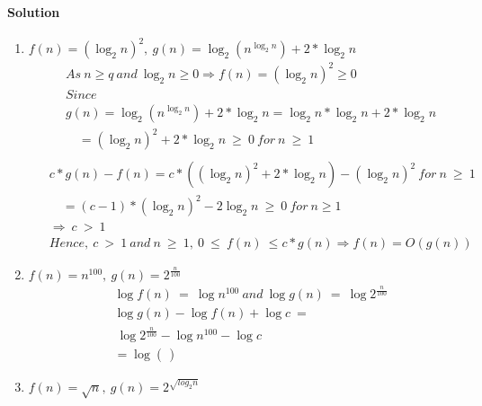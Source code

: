\documentclass[a4paper]{scrartcl}
\begin{document}
\paragraph{Solution}
\begin{enumerate}[label=(\alph*)]
  \item $f(n)=\left(\log_2n\right)^2,\ g(n)=\log_2\left(n^{\log_2{n}}\right) + 2*\log_2{n}$
  \begin{align*}
  &\ As\ n\geq q\ and\ \log_2{n}\geq 0 \Rightarrow f(n)=(\log_2{n})^2 \geq 0\\ &\
  Since\\ &\
  g(n)= \log_2\left(n^{\log_2{n}}\right) + 2*\log_2{n} = \log_2{n}*\log_2{n} + 2*\log_2{n}\\ &\
  \quad = \left(\log_2{n}\right)^2 + 2*\log_2{n}\ \geq\ 0\ for\ n\ \geq\ 1\\ &\
  \end{align*}
  \begin{align*}
  &\ c*g(n)-f(n)=c*(\left(\log_2{n}\right)^2 + 2*\log_2{n})-(\log_2{n})^2 \ for\ n\ \geq\ 1 \\ &\
  \quad=(c-1)*(\log_2{n})^2 - 2\log_2{n}\ \geq\ 0\ for\ n\geq1\\\ &\
  \Rightarrow\ c\ >\ 1\\ &\
  Hence,\ c\ >\ 1\ and\ n\ \geq\ 1,\ 0\ \leq\ f(n)\ \leq c*g(n) \Rightarrow f(n) = O(g(n))
  \end{align*}
  \item $f(n)= n^{100},\ g(n)=2^{\frac{n}{100}}$
  \begin{align*}
   &\ \log{f(n)}\ =\ \log{n^{100}}\ and\ \log{g(n)}\ =\ \log{2^{\frac{n}{100}}}\\ &\
    \log{g(n)}-\log{f(n)}+\log{c}\ =\\ &\
    \ \log{2^{\frac{n}{100}}}-\log{n^{100}}-\log{c}\\ &\
    =\log{(\frac{}{})}
  \end{align*}
  \item $f(n)=\sqrt{n},\ g(n)=2^{\sqrt{log_2 n}}$

\end{enumerate}
\end{document}
